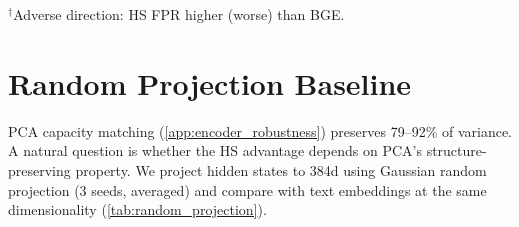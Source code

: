 \begin{table}[htbp]
\centering
\small
\caption{HS vs.\ BGE-large (1024d): balanced accuracy and FPR differences. Bootstrap: 10{,}000 resamples, two-sided null-centered. HB: Holm-Bonferroni correction (4 tests per metric, $\alpha{=}0.05$).}
\label{tab:bge_ba_fpr}
\begin{flushleft}
\scriptsize $^\dagger$Adverse direction: HS FPR higher (worse) than BGE.
\end{flushleft}
\end{table}


\section{Random Projection Baseline}
\label{app:random_projection}

PCA capacity matching (\cref{app:encoder_robustness}) preserves 79--92\% of variance. A natural question is whether the HS advantage depends on PCA's structure-preserving property. We project hidden states to 384d using Gaussian random projection (3 seeds, averaged) and compare with text embeddings at the same dimensionality (\cref{tab:random_projection}).

\begin{table}[htbp]
\centering
\small
\caption{Random projection (RP, 384d) vs.\ text (384d MiniLM). All $p < 0.001$ (1{,}000 bootstrap resamples). R1-8B uses $W{=}15$ (\cref{tab:hs_vs_text}: $W{=}3$); QwQ-32B evaluated at L60 (\cref{tab:hs_vs_text}: L63). 60/20/20 split.}
\label{tab:random_projection}
\end{table}

